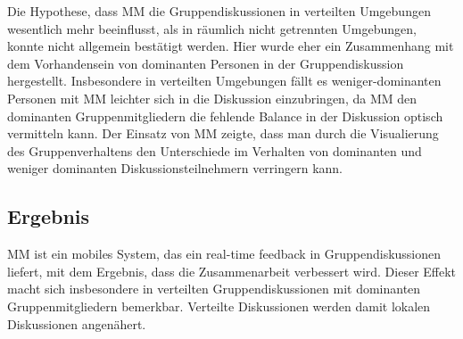 Die Hypothese, dass MM die Gruppendiskussionen in verteilten Umgebungen
wesentlich mehr beeinflusst, als in räumlich nicht getrennten Umgebungen, konnte
nicht allgemein bestätigt werden. Hier wurde eher ein Zusammenhang mit dem
Vorhandensein von dominanten Personen in der Gruppendiskussion hergestellt.
Insbesondere in verteilten Umgebungen fällt es weniger-dominanten Personen mit
MM leichter sich in die Diskussion einzubringen, da MM den dominanten
Gruppenmitgliedern die fehlende Balance in der Diskussion optisch vermitteln
kann. 
Der Einsatz von MM zeigte, dass man durch die Visualierung des Gruppenverhaltens
den Unterschiede im Verhalten von dominanten und weniger dominanten
Diskussionsteilnehmern verringern kann.

\subsection{Ergebnis}
MM ist ein mobiles System, das ein real-time feedback in Gruppendiskussionen
liefert, mit dem Ergebnis, dass die Zusammenarbeit verbessert wird.
Dieser Effekt macht sich insbesondere in verteilten Gruppendiskussionen mit
dominanten Gruppenmitgliedern bemerkbar. Verteilte Diskussionen werden damit
lokalen Diskussionen angenähert.


